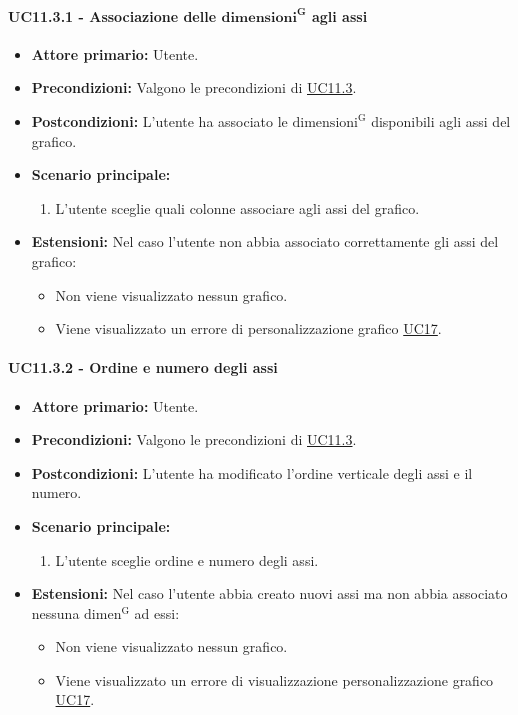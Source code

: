 \paragraph{UC11.3.1 - Associazione delle ${\mathbf{dimensioni^{G}}}$ agli assi}
\label{sec:UC11.3.1}
    \begin{itemize}
        \item \textbf{Attore primario:} Utente.
        \item \textbf{Precondizioni:} Valgono le precondizioni di \hyperref[sec:UC11.3]{UC11.3}.
	    \item \textbf{Postcondizioni:} L'utente ha associato le ${\mathrm{dimensioni^{G}}}$ disponibili agli assi del grafico.
	    \item \textbf{Scenario principale:} 
	    \begin{enumerate}
	    		\item L'utente sceglie quali colonne associare agli assi del grafico.
		\end{enumerate}
	    \item \textbf{Estensioni:} Nel caso l'utente non abbia associato correttamente gli assi del grafico:
              \begin{itemize}
                  \item Non viene visualizzato nessun grafico.
                  \item Viene visualizzato un errore di personalizzazione grafico \hyperref[sec:UC17 - Errore di personalizzazione]{UC17}.
              \end{itemize}
    \end{itemize}
    
\paragraph{UC11.3.2 - Ordine e numero degli assi}
\label{sec:UC11.3.2}
    \begin{itemize}
        \item \textbf{Attore primario:} Utente.
        \item \textbf{Precondizioni:} Valgono le precondizioni di \hyperref[sec:UC11.3]{UC11.3}.
	    \item \textbf{Postcondizioni:} L'utente ha modificato l'ordine verticale degli assi e il numero.
	    \item \textbf{Scenario principale:} 
	    \begin{enumerate}
	    		\item L'utente sceglie ordine e numero degli assi.
		\end{enumerate}
	    \item \textbf{Estensioni:} Nel caso l'utente abbia creato nuovi assi ma non abbia associato nessuna ${\mathrm{dimen^{G}}}$ ad essi:
              \begin{itemize}
                  \item Non viene visualizzato nessun grafico.
                  \item Viene visualizzato un errore di visualizzazione personalizzazione grafico \hyperref[sec:UC17 - Errore di personalizzazione]{UC17}.
              \end{itemize}
    \end{itemize}
    
